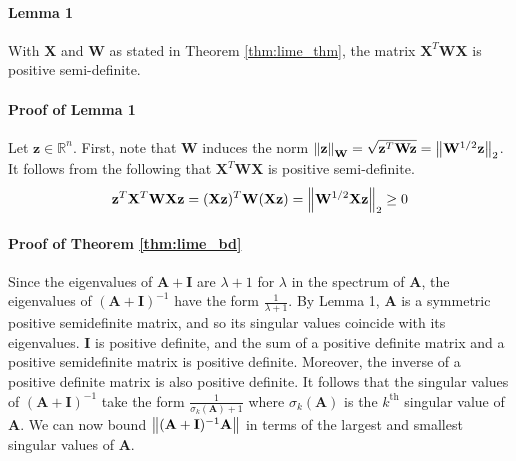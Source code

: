 \documentclass[mnsc,blindrev]{informs3}
\begin{document}
        \paragraph{Lemma 1}
            With $\mathbf{X}$ and $\mathbf{W}$ as stated in Theorem \ref{thm:lime_thm}, the matrix $\mathbf{X}^T \mathbf{W} \mathbf{X}$ is positive semi-definite.
            
        \paragraph{Proof of Lemma 1}
            Let $\mathbf{z} \in \mathbb{R}^n$. First, note that $\mathbf{W}$ induces the norm $\norm{\mathbf{z}}_\mathbf{W} = \sqrt{\mathbf{z}^T \mathbf{W} \mathbf{z}} = \norm{\mathbf{W}^{1/2}\mathbf{z}}_2$. It follows from the following that $\mathbf{X}^T \mathbf{W} \mathbf{X}$ is positive semi-definite.
            \begin{gather*}
                \mathbf{z}^T \mathbf{X}^T \mathbf{W} \mathbf{X} \mathbf{z} = (\mathbf{X} \mathbf{z})^T \mathbf{W} (\mathbf{X} \mathbf{z})
                = \norm{\mathbf{W}^{1/2} \mathbf{X}\mathbf{z}}_2 \geq 0
            \end{gather*}
             
            
        \paragraph{Proof of Theorem \ref{thm:lime_bd}}
            Since the eigenvalues of $\mathbf{A} + \mathbf{I}$ are $\lambda + 1$ for $\lambda$ in the spectrum of $\mathbf{A}$, the eigenvalues of $(\mathbf{A} + \mathbf{I})^{-1}$ have the form $\frac{1}{\lambda + 1}$. By Lemma 1, $\mathbf{A}$ is a symmetric positive semidefinite matrix, and so its singular values coincide with its eigenvalues. $\mathbf{I}$ is positive definite, and the sum of a positive definite matrix and a positive semidefinite matrix is positive definite. Moreover, the inverse of a positive definite matrix is also positive definite.  It follows that the singular values of $(\mathbf{A} + \mathbf{I})^{-1}$ take the form $\frac{1}{\sigma_k(\mathbf{A}) + 1}$ where $\sigma_k(\mathbf{A})$ is the $k^{\text{th}}$ singular value of $\mathbf{A}$. We can now bound $\norm{(\mathbf{A} + \mathbf{I})^{-1}\mathbf{A}}$ in terms of the largest and smallest singular values of $\mathbf{A}$. 
    
\end{document}

